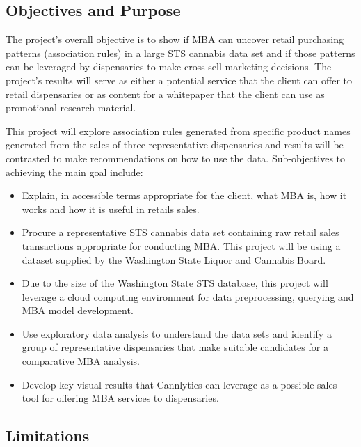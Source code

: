\documentclass[../article.tex, 12pt]{subfiles}
\begin{document}
\begin{multicols*}{2}
\subsection{Objectives and Purpose}

The project's overall objective is to show if MBA can uncover retail purchasing patterns (association rules) in a large STS cannabis data set and if those patterns can be leveraged by dispensaries to make cross-sell marketing decisions. The project's results will serve as either a potential service that the client can offer to retail dispensaries or as content for a whitepaper that the client can use as promotional research material.

\par
This project will explore association rules generated from specific product names generated from the sales of three representative dispensaries and results will be contrasted to make recommendations on how to use the data. Sub-objectives to achieving the main goal include:
\begin{itemize}
\item	Explain, in accessible terms appropriate for the client, what MBA is, how it works and how it is useful in retails sales.

\item	Procure a representative STS cannabis data set containing raw retail sales transactions appropriate for conducting MBA. This project will be using a dataset supplied by the Washington State Liquor and Cannabis Board.

\item	Due to the size of the Washington State STS database, this project will leverage a cloud computing environment for data preprocessing, querying and MBA model development. 

\item	Use exploratory data analysis to understand the data sets and identify a group of representative dispensaries that make suitable candidates for a comparative MBA analysis.

\item	Develop key visual results that Cannlytics can leverage as a possible sales tool for offering MBA services to dispensaries.

\end{itemize}

\subsection{Limitations}


\end{multicols*}
\end{document}
